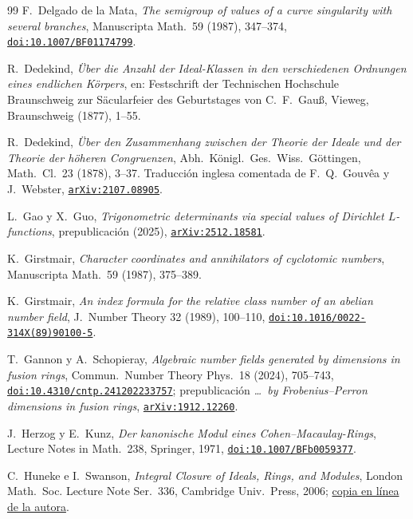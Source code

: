 \documentclass[11pt,a4paper]{article}
\theoremstyle{definition}
\begin{document}
\begin{thebibliography}{99}
 F.~Delgado de la Mata, \emph{The semigroup of values of a curve singularity with several branches}, Manuscripta Math.~59 (1987), 347--374, \href{https://doi.org/10.1007/BF01174799}{\texttt{doi:10.1007/BF01174799}}.

 R.~Dedekind, \emph{\"Uber die Anzahl der Ideal-Klassen in den verschiedenen Ordnungen eines endlichen K\"orpers}, en: Festschrift der Technischen Hochschule Braunschweig zur S\"acularfeier des Geburtstages von C.~F.~Gau{\ss}, Vieweg, Braunschweig (1877), 1--55.

 R.~Dedekind, \emph{\"Uber den Zusammenhang zwischen der Theorie der Ideale und der Theorie der h\"oheren Congruenzen}, Abh.~K\"onigl.~Ges.~Wiss.~G\"ottingen, Math.~Cl.~23 (1878), 3--37. Traducción inglesa comentada de F.~Q.~Gouv\^ea y J.~Webster, \href{https://arxiv.org/abs/2107.08905}{\texttt{arXiv:2107.08905}}.

 L.~Gao y X.~Guo, \emph{Trigonometric determinants via special values of Dirichlet $L$-functions},
prepublicación (2025), \href{https://arxiv.org/abs/2512.18581}{\texttt{arXiv:2512.18581}}.

 K.~Girstmair, \emph{Character coordinates and annihilators of cyclotomic numbers}, Manuscripta
Math.~59 (1987), 375--389.

 K.~Girstmair, \emph{An index formula for the relative class number of an abelian number field}, J.~Number Theory 32 (1989), 100--110, \href{https://doi.org/10.1016/0022-314X(89)90100-5}{\texttt{doi:10.1016/0022-314X(89)90100-5}}.

 T.~Gannon y A.~Schopieray, \emph{Algebraic number fields generated by dimensions in fusion rings}, Commun.~Number Theory Phys.~18 (2024), 705--743, \href{https://doi.org/10.4310/cntp.241202233757}{\texttt{doi:10.4310/cntp.241202233757}}; prepublicación \emph{\dots\ by Frobenius--Perron dimensions in fusion rings}, \href{https://arxiv.org/abs/1912.12260}{\texttt{arXiv:1912.12260}}.

 J.~Herzog y E.~Kunz, \emph{Der kanonische Modul eines Cohen--Macaulay-Rings}, Lecture Notes in Math.~238, Springer, 1971, \href{https://doi.org/10.1007/BFb0059377}{\texttt{doi:10.1007/BFb0059377}}.

 C.~Huneke e I.~Swanson, \emph{Integral Closure of Ideals, Rings, and Modules}, London Math.~Soc. Lecture Note Ser.~336, Cambridge Univ.~Press, 2006; \href{https://www.math.purdue.edu/\%7Eiswanso/book/}{copia en línea de la autora}.


\end{thebibliography}
\end{document}
